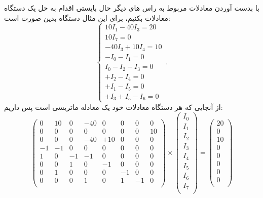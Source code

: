 با بدست آوردن معادلات
مربوط به راس های دیگر حال بایستی اقدام به حل یک دستگاه معادلات بکنیم،
برای این مثال دستگاه بدین صورت است:
\begin{equation}
	\begin{cases}
		10 I_1 - 40 I_3 = 20\\
		10 I_7 = 0\\
		-40 I_3 + 10 I_4 = 10\\
		-I_0  -I_1 = 0\\
		I_0 -I_2 -I_3 = 0\\
		+I_2 - I_4 = 0 \\
		+I_1 - I_5 = 0 \\
		+I_3 + I_5 - I_6 = 0
	\end{cases}\,.
\end{equation}
از آنجایی که هر دستگاه معادلات خود یک معادله ماتریسی است پس داریم:
\begin{equation}
	\begin{pmatrix}
		0 & 10 & 0 & -40 & 0 & 0 & 0 & 0\\
		0 & 0 & 0 & 0 & 0 & 0 & 0 & 10\\
		0 & 0 & 0 & -40 & +10 & 0 & 0 & 0\\
		-1 & -1 & 0 & 0 & 0 & 0 & 0 & 0\\
		1 & 0 & -1 & -1 & 0 & 0 & 0 & 0\\
		0 & 0 & 1 & 0 & -1 & 0 & 0 & 0\\
		0 & 1 & 0 & 0 & 0 & -1 & 0 & 0\\
		0 & 0 & 0 & 1 & 0 & 1 & -1 & 0\\
	\end{pmatrix}
	\times
	\begin{pmatrix}
		I_0\\
		I_1\\
		I_2\\
		I_3\\
		I_4\\
		I_5\\
		I_6\\
		I_7\\
	\end{pmatrix}
	=
	\begin{pmatrix}
		20\\
		0\\
		10\\
		0\\
		0\\
		0\\
		0\\
		0\\
	\end{pmatrix}
\end{equation}

